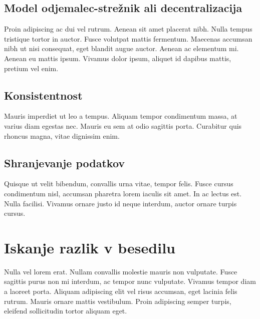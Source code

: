 \documentclass[a4paper, 12pt, twoside]{book}
\begin{document}
\section{Model odjemalec-strežnik ali decentralizacija}

Proin adipiscing ac dui vel rutrum. Aenean sit amet placerat nibh. Nulla tempus tristique tortor in auctor. Fusce volutpat mattis fermentum. Maecenas accumsan nibh ut nisi consequat, eget blandit augue auctor. Aenean ac elementum mi. Aenean eu mattis ipsum. Vivamus dolor ipsum, aliquet id dapibus mattis, pretium vel enim.

\section{Konsistentnost}

Mauris imperdiet ut leo a tempus. Aliquam tempor condimentum massa, at varius diam egestas nec. Mauris eu sem at odio sagittis porta. Curabitur quis rhoncus magna, vitae dignissim enim.

\section{Shranjevanje podatkov}

Quisque ut velit bibendum, convallis urna vitae, tempor felis. Fusce cursus condimentum nisl, accumsan pharetra lorem iaculis sit amet. In ac lectus est. Nulla facilisi. Vivamus ornare justo id neque interdum, auctor ornare turpis cursus.

\chapter{Iskanje razlik v besedilu}

Nulla vel lorem erat. Nullam convallis molestie mauris non vulputate. Fusce sagittis purus non mi interdum, ac tempor nunc vulputate. Vivamus tempor diam a laoreet porta. Aliquam adipiscing elit vel risus accumsan, eget lacinia felis rutrum. Mauris ornare mattis vestibulum. Proin adipiscing semper turpis, eleifend sollicitudin tortor aliquam eget.

\end{document}

